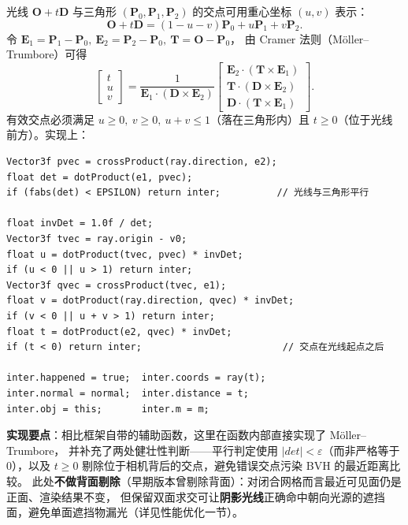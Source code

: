 \documentclass[11pt]{ctexart}
\begin{document}
光线 $\mathbf{O}+t\mathbf{D}$ 与三角形 $(\mathbf{P}_0,\mathbf{P}_1,\mathbf{P}_2)$ 的交点可用重心坐标 $(u,v)$ 表示：
\begin{equation}
\mathbf{O}+t\mathbf{D}=(1-u-v)\mathbf{P}_0+u\mathbf{P}_1+v\mathbf{P}_2.
\end{equation}
令 $\mathbf{E}_1=\mathbf{P}_1-\mathbf{P}_0,\ \mathbf{E}_2=\mathbf{P}_2-\mathbf{P}_0,\ \mathbf{T}=\mathbf{O}-\mathbf{P}_0$，
由 Cramer 法则（Möller–Trumbore）可得
\begin{equation}
\begin{bmatrix}t\\u\\v\end{bmatrix}
=\frac{1}{\mathbf{E}_1\cdot(\mathbf{D}\times\mathbf{E}_2)}
\begin{bmatrix}
\mathbf{E}_2\cdot(\mathbf{T}\times\mathbf{E}_1)\\
\mathbf{T}\cdot(\mathbf{D}\times\mathbf{E}_2)\\
\mathbf{D}\cdot(\mathbf{T}\times\mathbf{E}_1)
\end{bmatrix}.
\end{equation}
有效交点必须满足 $u\ge0,\ v\ge0,\ u+v\le1$（落在三角形内）且 $t\ge0$（位于光线前方）。实现上：

\begin{lstlisting}
Vector3f pvec = crossProduct(ray.direction, e2);
float det = dotProduct(e1, pvec);
if (fabs(det) < EPSILON) return inter;          // 光线与三角形平行

float invDet = 1.0f / det;
Vector3f tvec = ray.origin - v0;
float u = dotProduct(tvec, pvec) * invDet;
if (u < 0 || u > 1) return inter;
Vector3f qvec = crossProduct(tvec, e1);
float v = dotProduct(ray.direction, qvec) * invDet;
if (v < 0 || u + v > 1) return inter;
float t = dotProduct(e2, qvec) * invDet;
if (t < 0) return inter;                         // 交点在光线起点之后

inter.happened = true;  inter.coords = ray(t);
inter.normal = normal;  inter.distance = t;
inter.obj = this;       inter.m = m;
\end{lstlisting}

\noindent\textbf{实现要点}：相比框架自带的辅助函数，这里在函数内部直接实现了 Möller–Trumbore，
并补充了两处健壮性判断——平行判定使用 $|det|<\varepsilon$（而非严格等于 0），以及 $t\ge0$
剔除位于相机背后的交点，避免错误交点污染 BVH 的最近距离比较。
此处\textbf{不做背面剔除}（早期版本曾剔除背面）：对闭合网格而言最近可见面仍是正面、渲染结果不变，
但保留双面求交可让\textbf{阴影光线}正确命中朝向光源的遮挡面，避免单面遮挡物漏光（详见性能优化一节）。
\end{document}
